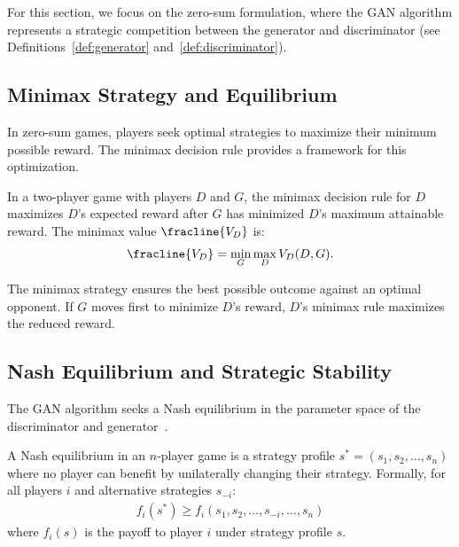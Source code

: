 \begin{remark}
  For this section, we focus on the zero-sum formulation, where the GAN algorithm represents a strategic competition between the generator and discriminator (see Definitions~\ref{def:generator} and~\ref{def:discriminator}).
\end{remark}

\subsection{Minimax Strategy and Equilibrium}

In zero-sum games, players seek optimal strategies to maximize their minimum possible reward. The minimax decision rule provides a framework for this optimization.

\begin{definition}
  \label{def:minimax}
  In a two-player game with players $D$ and $G$, the \textnormal{\sffamily minimax decision rule} for $D$ maximizes $D$'s expected reward after $G$ has minimized $D$'s maximum attainable reward. The \textnormal{\sffamily minimax value} $\fracline{V_D}$ is:
  \begin{align}
    \fracline{V_D} = \min_{G} \max_{D} V_D(D, G).
  \end{align}
\end{definition}

The minimax strategy ensures the best possible outcome against an optimal opponent. If $G$ moves first to minimize $D$'s reward, $D$'s minimax rule maximizes the reduced reward.

\subsection{Nash Equilibrium and Strategic Stability}

The GAN algorithm seeks a Nash equilibrium in the parameter space of the discriminator and generator~\cite{ref:goodfellow-2016,ref:goodfellow-2017}.

\begin{definition}
  A \textnormal{\sffamily Nash equilibrium} in an $n$-player game is a strategy profile $s^* = (s_1, s_2, \dots, s_n)$ where no player can benefit by unilaterally changing their strategy. Formally, for all players $i$ and alternative strategies $s_{-i}$:
  \begin{align}
    f_i(s^*) \geq f_i(s_1, s_2, \dots, s_{-i}, \dots, s_n)
  \end{align}
  where $f_i(s)$ is the payoff to player $i$ under strategy profile $s$.
\end{definition}

